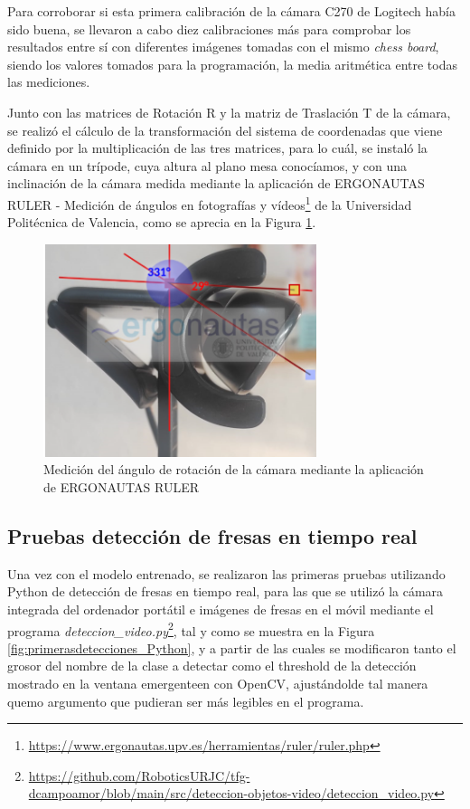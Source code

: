 Para corroborar si esta primera calibración de la cámara C270 de Logitech había sido buena, se llevaron a cabo diez calibraciones más para comprobar los resultados entre sí con diferentes imágenes tomadas con el mismo \textit{chess board}, siendo los valores tomados para la programación, la media aritmética entre todas las mediciones.

Junto con las matrices de Rotación R y la matriz de Traslación T de la cámara, se realizó el cálculo de la transformación del sistema de coordenadas que viene definido por la multiplicación de las tres matrices, para lo cuál, se instaló la cámara en un trípode, cuya altura al plano mesa conocíamos, y con una inclinación de la cámara medida mediante la aplicación de ERGONAUTAS RULER - Medición de ángulos en fotografías y vídeos\footnote{\url{https://www.ergonautas.upv.es/herramientas/ruler/ruler.php}} de la Universidad Politécnica de Valencia, como se aprecia en la Figura \ref{fig:medicion_angulo_ERGONAUTAS}.

 \begin{figure}[H]
     \centering
     \begin{center}
       \includegraphics[width=80mm]{figs/ERGONAUTAS Medicion angulo.png}
     \end{center}
     \caption{Medición del ángulo de rotación de la cámara mediante la aplicación de ERGONAUTAS RULER}
    \label{fig:medicion_angulo_ERGONAUTAS}
  \end{figure}


\subsection{Pruebas detección de fresas en tiempo real}
\label{sec:Pruebas_Fresas_Pytorch}

Una vez con el modelo entrenado, se realizaron las primeras pruebas utilizando Python de detección de fresas en tiempo real, para las que se utilizó la cámara integrada del ordenador portátil e imágenes de fresas en el móvil mediante el programa \textit{deteccion\_video.py}\footnote{\url{https://github.com/RoboticsURJC/tfg-dcampoamor/blob/main/src/deteccion-objetos-video/deteccion_video.py}}, tal y como se muestra en la Figura \ref{fig:primerasdetecciones_Python}, y a partir de las cuales se modificaron tanto el grosor del nombre de la clase a detectar como el threshold de la detección mostrado en la ventana emergenteen con OpenCV, ajustándolde tal manera quemo argumento que pudieran ser más legibles en el programa.

